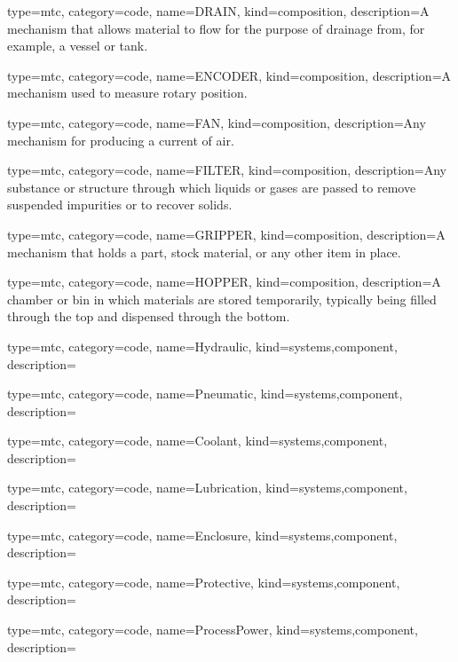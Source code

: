 {
  type=mtc,
  category=code,
  name={DRAIN},
  kind={composition},
  description={A mechanism that allows material to flow for the purpose of drainage from, for example, a vessel or tank.}
}


{
  type=mtc,
  category=code,
  name={ENCODER},
  kind={composition},
  description={A mechanism used to measure rotary position.}
}


{
  type=mtc,
  category=code,
  name={FAN},
  kind={composition},
  description={Any mechanism for producing a current of air.}
}


{
  type=mtc,
  category=code,
  name={FILTER},
  kind={composition},
  description={Any substance or structure through which liquids or gases are passed to remove suspended impurities or to recover solids.}
}


{
  type=mtc,
  category=code,
  name={GRIPPER},
  kind={composition},
  description={A mechanism that holds a part, stock material, or any other item in place.}
}


{
  type=mtc,
  category=code,
  name={HOPPER},
  kind={composition},
  description={A chamber or bin in which materials are stored temporarily, typically being filled through the top and dispensed through the bottom.}
}


{
  type=mtc,
  category=code,
  name={Hydraulic},
  kind={systems,component},
  description={}
}


{
  type=mtc,
  category=code,
  name={Pneumatic},
  kind={systems,component},
  description={}
}


{
  type=mtc,
  category=code,
  name={Coolant},
  kind={systems,component},
  description={}
}


{
  type=mtc,
  category=code,
  name={Lubrication},
  kind={systems,component},
  description={}
}


{
  type=mtc,
  category=code,
  name={Enclosure},
  kind={systems,component},
  description={}
}


{
  type=mtc,
  category=code,
  name={Protective},
  kind={systems,component},
  description={}
}


{
  type=mtc,
  category=code,
  name={ProcessPower},
  kind={systems,component},
  description={}
}


